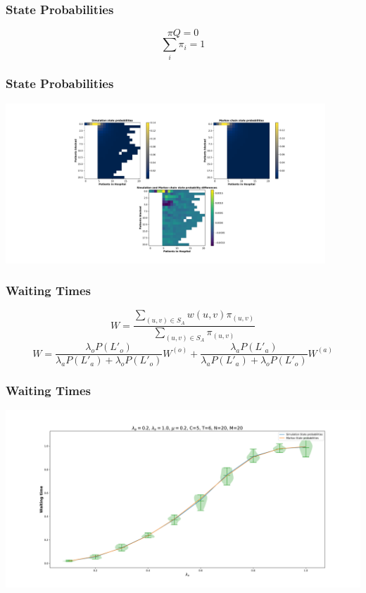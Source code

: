 \begin{frame}
    \frametitle{State Probabilities}

    \centering
    \[ \pi Q = 0 \]
    \[ \sum_{i} \pi_i = 1 \]

\end{frame}

\begin{frame}
    \frametitle{State Probabilities}
    \centering
    \includegraphics[trim=850 350 180 70, clip, width=0.9\textwidth]{Bin/src/heatmap.pdf}
\end{frame}


\begin{frame}
    \frametitle{Waiting Times}

    \[        
    W = \frac{\sum_{(u,v) \in S_A} w(u,v) \pi_{(u,v)}}{\sum_{(u,v) \in S_A} \pi_{(u,v)}}
    \]
    \vspace{1cm}
    \[
    W = \frac{\lambda_o P(L'_o)}{\lambda_a P(L'_a) + \lambda_o P(L'_o)} W^{(o)} + \frac{\lambda_a P(L'_a)}{\lambda_a P(L'_a) + \lambda_o P(L'_o)} W^{(a)}
    \]

\end{frame}

\begin{frame}
    \frametitle{Waiting Times}
    \centering
    \includegraphics[trim=110 40 110 60, clip, width=\textwidth]{Bin/src/waiting_times.pdf}
\end{frame}
